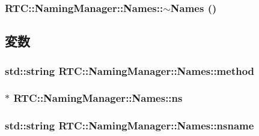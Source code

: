 \subsubsection[{$\sim$Names}]{\setlength{\rightskip}{0pt plus 5cm}RTC::NamingManager::Names::$\sim$Names ()\hspace{0.3cm}{\ttfamily  [inline]}}\label{classRTC_1_1NamingManager_1_1Names_ac85bbc0dd044798db451ba1b78565088}


\subsection{変数}
\subsubsection[{method}]{\setlength{\rightskip}{0pt plus 5cm}std::string {\bf RTC::NamingManager::Names::method}}\label{classRTC_1_1NamingManager_1_1Names_af91cd5f33926928072f5f620a83c5ace}
\subsubsection[{ns}]{$\ast$ {\bf RTC::NamingManager::Names::ns}}\label{classRTC_1_1NamingManager_1_1Names_a704904910fea3bf04cf6db7126ec3c29}
\subsubsection[{nsname}]{\setlength{\rightskip}{0pt plus 5cm}std::string {\bf RTC::NamingManager::Names::nsname}}\label{classRTC_1_1NamingManager_1_1Names_afd60a3c02c75c896ef6110f02acf25b0}
